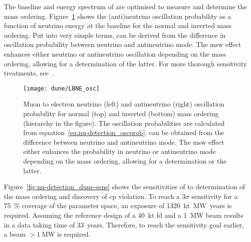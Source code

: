 The baseline and energy spectrum of \dune{} are optimised to measure \dcp{} and determine the mass ordering.
Figure~\ref{fig:nu-detection_dune-osc} shows the (anti)neutrino oscillation probability as a function of neutrino energy at the \dune{} baseline for the normal and inverted mass ordering.
Put into very simple terms, \dcp{} can be derived from the difference in oscillation probability between neutrino and antineutrino mode.
The \gls{msw} effect enhances either neutrino or antineutrino oscillation depending on the mass ordering, allowing for a determination of the latter.
For more thorough sensitivity treatments, see~\cite{king, duneT2HKSens, qianVogel}.

\begin{figure}[htb]
	\centering
	\texttt{[image: dune/LBNE\_osc]}
	\caption{Muon to electron neutrino (left) and antineutrino (right) oscillation probability for normal (top) and inverted (bottom) mass ordering (hierarchy in the figure).
	The oscillation probabilities are calculated from equation~\eqref{eq:nu-detection_oscprob}.
	\dcp{} can be obtained from the difference between neutrino and antineutrino mode.
	The \gls{msw} effect either enhances the probability in neutrino or antineutrino mode depending on the mass ordering, allowing for a determination or the latter.~\cite{qianVogel}}
	\label{fig:nu-detection_dune-osc}
\end{figure}

Figure~\ref{fig:nu-detection_dune-sens} shows the sensitivities of \dune{} to determination of the mass ordering and discovery of \gls{cp} violation.
To reach a $3 \sigma$ sensitivity for a \SI{75}{\percent} coverage of the \dcp{} parameter space, an exposure of \SI{1320}{\kilo\tonne\mega\watt.years} is required.
Assuming the reference design of a \SI{40}{\kilo\tonne} \gls{fd} and a \SI{1}{\mega\watt} beam results in a data taking time of \SI{33}{years}.
Therefore, to reach the sensitivity goal earlier, a beam $> \SI{1}{\mega\watt}$ is required.


